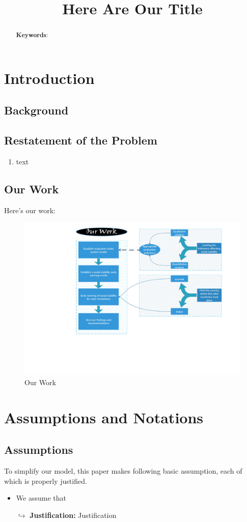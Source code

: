 \documentclass[12pt]{article}  %
\title{{\sc Here Are Our Title}}  %
\begin{document}
\begin{abstract}

    \vspace{5pt}
    \textbf{Keywords}:

\end{abstract}

\maketitle  %
\tableofcontents  %


\section{Introduction}
\subsection{Background}

\subsection{Restatement of the Problem}
\begin{enumerate}
\item text
\end{enumerate}
\subsection{Our Work}
{\LARGE\CheckedBox} 

 Here's our work:
\begin{figure}[htbp]
\centering
\includegraphics[width=.4\textwidth]{img/our work.pdf}
\caption{Our Work}
\end{figure}


\section{Assumptions and Notations}
\subsection{Assumptions}
To simplify our model, this paper makes following basic assumption, each of which is properly
justified.
\begin{itemize}
	\item We assume that

	$\hookrightarrow$ \textbf{Justification:} Justification
\end{itemize}
\end{document}
